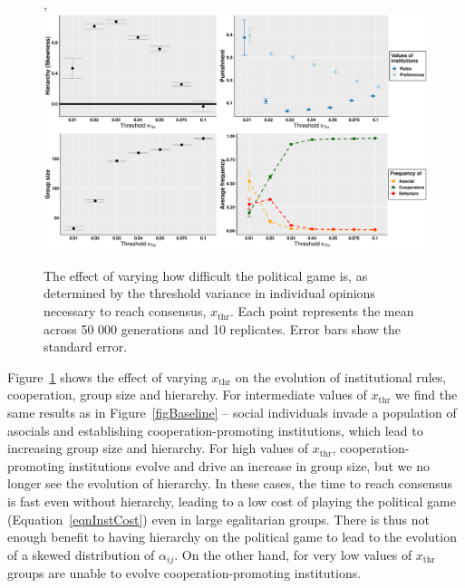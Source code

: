 \documentclass{rstb}
\begin{document}
\begin{linenumbers}
\begin{figure}, 
    \centering
    \includegraphics[width=0.8\linewidth]{Figures/pt_xThr_errorbar.pdf}
    \caption{The effect of varying how difficult the political game is, as determined by the threshold variance in individual opinions necessary to reach consensus, $x_\mathrm{thr}$. Each point represents the mean across 50 000 generations and 10 replicates. Error bars show the standard error.}
    \label{figXThr}
\end{figure}


Figure~\ref{figXThr} shows the effect of varying $x_\mathrm{thr}$ on the evolution of institutional rules, cooperation, group size and hierarchy. For intermediate values of $x_\mathrm{thr}$ we find the same results as in Figure~\ref{figBaseline} -- social individuals invade a population of asocials and establishing cooperation-promoting institutions, which lead to increasing group size and hierarchy. For high values of $x_\mathrm{thr}$, cooperation-promoting institutions evolve and drive an increase in group size, but we no longer see the evolution of hierarchy. In these cases, the time to reach consensus is fast even without hierarchy, leading to a low cost of playing the political game (Equation~\ref{eqnInstCost}) even in large egalitarian groups. There is thus not enough benefit to having hierarchy on the political game to lead to the evolution of a skewed distribution of $\alpha_{ij}$. On the other hand, for very low values of $x_\mathrm{thr}$ groups are unable to evolve cooperation-promoting institutions.


\end{linenumbers}
\end{document}
